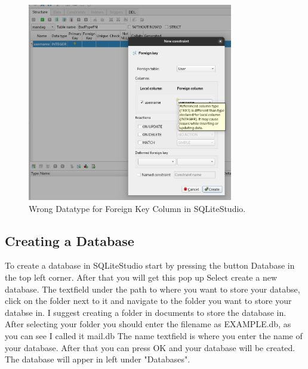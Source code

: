 \documentclass[a4paper,11pt,oneside]{article}
\begin{document}
\begin{sloppypar}
\begin{figure}[!htb]
  \centering
  \includegraphics[width=0.8\textwidth]{sqlitestudio/badfndatatype.png}
  \caption{Wrong Datatype for Foreign Key Column in SQLiteStudio.}
  \label{fig:badfndatatype}
\end{figure}





\subsection{Creating a Database}
\label{sqliteStudioCreatingDatabase}
To create a database in SQLiteStudio start by pressing the button Database in the top left corner. After that you will get this pop up
Select create a new database. The textfield under the path to where you want to store your databse, click on the folder next to it and navigate to the folder you want to store your databse in. I suggest creating a folder in documents to store the database in. After selecting your folder you should enter the filename as EXAMPLE.db, as you can see I called it mail.db  The name textfield is where you enter the name of your database. After that you can press OK and your database will be created. The database will apper in left under "Databases".


\end{sloppypar}
\end{document}
